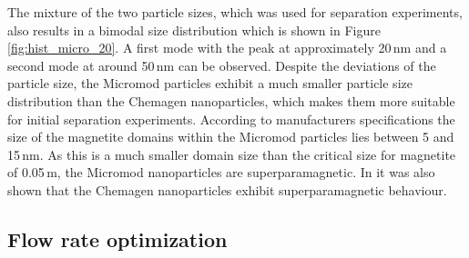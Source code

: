 The mixture of the two particle sizes, which was used for separation experiments, also results in a bimodal size distribution which is shown in Figure \ref{fig:hist_micro_20}. A first mode with the peak at approximately 20\,nm and a second mode at around 50\,nm can be observed. Despite the deviations of the particle  size, the Micromod particles exhibit a much smaller particle size distribution than the Chemagen nanoparticles, which makes them more suitable for initial separation experiments. According to manufacturers specifications the size of the magnetite domains within the Micromod particles lies between 5 and 15\,nm. As this is a much smaller domain size than the critical size for magnetite of 0.05\,\textmu m, the Micromod nanoparticles are superparamagnetic. In \cite{AndreMaster} it was also shown that the Chemagen nanoparticles exhibit superparamagnetic behaviour. \newpage

% 
% 
% 

\subsection{Flow rate optimization}
\label{subsec:flow_rate_res}

